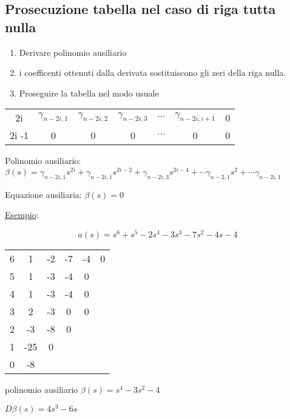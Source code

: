 \documentclass{article}
\begin{document}
\subsection{Prosecuzione tabella nel caso di riga tutta nulla}

\begin{enumerate}
    \item Derivare polinomio ausiliario
    \item i coefficenti ottenuti dalla derivata sostituiscono gli zeri della riga nulla.
    \item Proseguire la tabella nel modo usuale
\end{enumerate}

\begin{center}
\begin{tabular}{c|c c c c c c}
    2i & $\gamma_{n-2i,1}$ & $\gamma_{n-2i,2}$ & $\gamma_{n-2i,3}$  & $\cdots$ & $\gamma_{n-2i,i+1}$  & 0 \\
    2i -1 & 0 & 0 & 0 & $\cdots$ & 0 & 0
\end{tabular}
\end{center}

Polinomio ausiliario:
$ \beta(s) = \gamma_{n-2i,1} s^{2i} + \gamma_{n-2i,1} s^{2i-2} +\gamma_{n-2i,3} s^{2i - 4}  + \cdots \gamma_{n-2,1} s^{2} +  \cdots \gamma_{n-2i,1} $

Equazione ausiliaria: $ \beta(s) = 0$

\underline{Esempio}:

\begin{minipage}{0.5\textwidth}
    \[ a(s) = s^6 + s^5 - 2s^4 -3s^3 - 7s^2 -4s -4 \]
    \begin{center}
        \begin{tabular}{c|c c c c c}
            6 & 1 & -2 & -7 & -4 & 0\\
            5 & 1 & -3 & -4 & 0\\
            4 & 1 & -3 & -4 & 0\\
            \hline
            3 & 2 & -3 & 0 & 0\\
            2 & -3 & -8 & 0\\
            1 & -25 & 0\\
            0 & -8
        \end{tabular}
    \end{center}
\end{minipage}
\begin{minipage}{0.5\textwidth}
    polinomio ausiliario $\beta(s) = s^4 -3s^2 -4$

    $D\beta(s) = 4s^3 - 6s$
\end{minipage}
\end{document}
